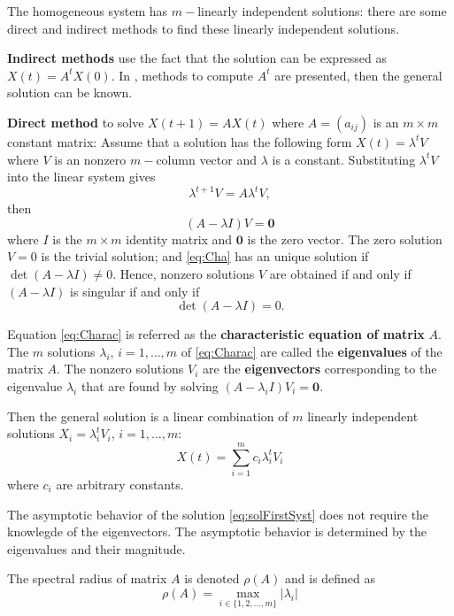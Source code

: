 The homogeneous system has $m-$linearly independent solutions: there are some direct and indirect methods to find these linearly independent solutions.

{\bf Indirect methods} use the fact that the solution can be expressed as $X(t)=A^tX(0). $ In \cite{Elaydi1998}, methods to compute $A^t$ are presented, then the general solution can be known.

{\bf Direct method} to solve $X(t+1)=AX(t)$ where $A=(a_{ij})$ is an $m\times m$ constant matrix:
Assume that a solution has the following form $X(t)=\lambda ^t V$ where $V$ is an nonzero $m-$column vector and $\lambda$ is a constant. Substituting $\lambda ^t V$ into the linear system gives
$$\lambda ^{t+1} V=A\lambda ^t V,$$
then
\begin{equation}(A - \lambda I) V=\mathbf{0}\label{eq:Cha}\end{equation}
where $I$ is the $m\times m$ identity matrix and $\mathbf{0}$ is the zero vector. The zero solution $V=0$ is the trivial solution; and \eqref{eq:Cha} has an unique solution if $\det(A - \lambda I)\not =0$. Hence, nonzero solutions $V$ are obtained if and only if $(A - \lambda I) $ is singular if and only if 
\begin{equation}\det(A - \lambda I) =0.\label{eq:Charac}\end{equation}

Equation \eqref{eq:Charac} is referred as the {\bf characteristic equation of matrix} $A$. The $m$ solutions $\lambda_i$, $i=1,\dots, m$ of \eqref{eq:Charac} are called the {\bf eigenvalues} of the matrix $A$. The nonzero solutions $V_i$ are the {\bf eigenvectors} corresponding to the eigenvalue $\lambda_i$ that are found by solving $(A - \lambda_i I) V_i=\mathbf{0}$.

Then the general solution is a linear combination of $m$ linearly independent solutions $X_i=\lambda _i ^t V_i$, $i=1,\dots, m$:
\begin{equation}X(t)=\sum_{i=1}^m c_i\lambda _i ^t V_i\label{eq:solFirstSyst}\end{equation}
where $c_i$ are arbitrary constants.

The asymptotic behavior of the solution \eqref{eq:solFirstSyst} does not require the knowlegde of the eigenvectors. The asymptotic behavior is determined by the eigenvalues and their magnitude.

\begin{definition}
The spectral radius of matrix $A$ is denoted $\rho(A)$ and is defined as
$$\rho(A)=\max_{i\in \{1,2,\dots,m\}}|\lambda_i|$$
\end{definition}


